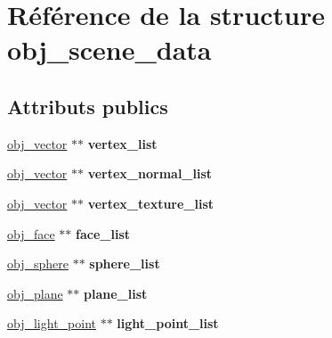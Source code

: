 \hypertarget{structobj__scene__data}{\section{Référence de la structure obj\-\_\-scene\-\_\-data}
\label{structobj__scene__data}
}
\subsection*{Attributs publics}
\begin{DoxyCompactItemize}
\item 
\hypertarget{structobj__scene__data_ae63c9e7899791d0ac616aab05d2a3d55}{\hyperlink{structobj__vector}{obj\-\_\-vector} $\ast$$\ast$ {\bfseries vertex\-\_\-list}}\label{structobj__scene__data_ae63c9e7899791d0ac616aab05d2a3d55}

\item 
\hypertarget{structobj__scene__data_a8407af16c78de18ecb879dc627109560}{\hyperlink{structobj__vector}{obj\-\_\-vector} $\ast$$\ast$ {\bfseries vertex\-\_\-normal\-\_\-list}}\label{structobj__scene__data_a8407af16c78de18ecb879dc627109560}

\item 
\hypertarget{structobj__scene__data_a31170ee75ff892af0c72eace0c6da368}{\hyperlink{structobj__vector}{obj\-\_\-vector} $\ast$$\ast$ {\bfseries vertex\-\_\-texture\-\_\-list}}\label{structobj__scene__data_a31170ee75ff892af0c72eace0c6da368}

\item 
\hypertarget{structobj__scene__data_a64650d8d984a1c2aadab3625a29981cb}{\hyperlink{structobj__face}{obj\-\_\-face} $\ast$$\ast$ {\bfseries face\-\_\-list}}\label{structobj__scene__data_a64650d8d984a1c2aadab3625a29981cb}

\item 
\hypertarget{structobj__scene__data_a48c0c2242f103292e3319d0f0ba25b6c}{\hyperlink{structobj__sphere}{obj\-\_\-sphere} $\ast$$\ast$ {\bfseries sphere\-\_\-list}}\label{structobj__scene__data_a48c0c2242f103292e3319d0f0ba25b6c}

\item 
\hypertarget{structobj__scene__data_aa4963650fca6d3ffc3c8ed6c8abdd27c}{\hyperlink{structobj__plane}{obj\-\_\-plane} $\ast$$\ast$ {\bfseries plane\-\_\-list}}\label{structobj__scene__data_aa4963650fca6d3ffc3c8ed6c8abdd27c}

\item 
\hypertarget{structobj__scene__data_ac9d4ade26879f621c8be95ef60288fc5}{\hyperlink{structobj__light__point}{obj\-\_\-light\-\_\-point} $\ast$$\ast$ {\bfseries light\-\_\-point\-\_\-list}}\label{structobj__scene__data_ac9d4ade26879f621c8be95ef60288fc5}


\end{DoxyCompactItemize}
